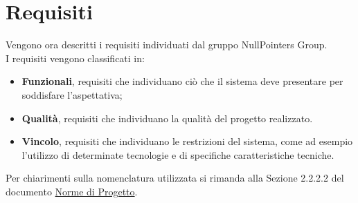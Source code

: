 \section{Requisiti}
Vengono ora descritti i requisiti individuati dal gruppo NullPointers Group.\\
I requisiti vengono classificati in:
\begin{itemize}
   \item \textbf{Funzionali}, requisiti che individuano ciò che il sistema deve presentare per soddisfare
   l'aspettativa; 
   \item \textbf{Qualità}, requisiti che individuano la qualità del progetto realizzato.
   \item \textbf{Vincolo}, requisiti che individuano le restrizioni del sistema, come ad esempio l'utilizzo di determinate tecnologie e di specifiche caratteristiche tecniche.
\end{itemize}

Per chiarimenti sulla nomenclatura utilizzata si rimanda alla Sezione 2.2.2.2 del documento \href{https://nullpointersgroup.github.io/Documentazione/output/RTB/Documenti%20Interni/Norme_di_Progetto.pdf}{Norme di Progetto}.

